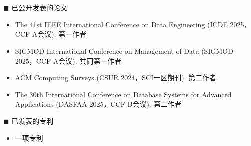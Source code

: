 \chapter*{}
\vskip 5mm

  {\heiti $\blacksquare$ 已公开发表的论文}\vskip 5mm

\begin{itemize}
  \item 
  The 41st IEEE International Conference on Data Engineering (ICDE 2025，CCF-A会议). 第一作者

  \item 
  SIGMOD International Conference on Management of Data (SIGMOD 2025，CCF-A会议). 共同第一作者

  \item 
  ACM Computing Surveys (CSUR 2024，SCI一区期刊). 第二作者

  \item 
  The 30th International Conference on Database Systems for Advanced Applications (DASFAA 2025，CCF-B会议). 第二作者
\end{itemize}

\bigskip\bigskip

{\heiti $\blacksquare$ 已发表的专利}\vskip 5mm

\begin{itemize}
  \item 一项专利
\end{itemize}
